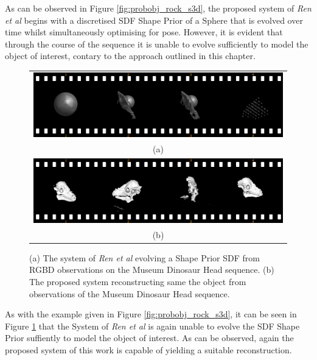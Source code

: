 As can be observed in Figure \ref{fig:probobj_rock_s3d}, the proposed system of 
\textit{Ren et al} begins with a discretised SDF Shape Prior of a Sphere that is 
evolved over time whilst simultaneously optimising for pose. However, it is evident 
that through the course of the sequence it is unable to evolve sufficiently to model 
the object of interest, contary to the approach outlined in this chapter.

\begin{figure}[ht]
  \label{fig:probobj_dino_s3d}
  \centering
  \begin{tabular}{@{}c@{}}
    \includegraphics[width=.6\linewidth]{figures/object_recon/strips/dino_s3d.png} \\
    (a) \\
    \includegraphics[width=.6\linewidth]{figures/object_recon/strips/dino.png} \\ 
    (b) \\
  \end{tabular}
  \caption[Probabilistic Object Reconstruction Qualitative Results II]
  {(a) The system of \textit{Ren et al} \cite{Ren2013} evolving a Shape Prior SDF 
  from RGBD observations on the Museum Dinosaur Head sequence. (b) The proposed system 
  reconstructing same the object from observations of the Museum Dinosaur Head sequence.}
\end{figure}

As with the example given in Figure \ref{fig:probobj_rock_s3d}, it can be seen in 
Figure \ref{fig:probobj_dino_s3d} that the System of \textit{Ren et al} is again 
unable to evolve the SDF Shape Prior suffiently to model the object of interest. As 
can be observed, again the proposed system of this work is capable of yielding a suitable 
reconstruction.

